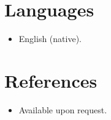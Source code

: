 \documentclass[11pt,a4paper,sans]{moderncv}
\begin{document}

\section{Languages}
\vspace{1pt}
\begin{itemize}
\item English (native).
\end{itemize}


\section{References}
\vspace{1pt}
\begin{itemize}
\item{Available upon request.}
\end{itemize}
\end{document}
